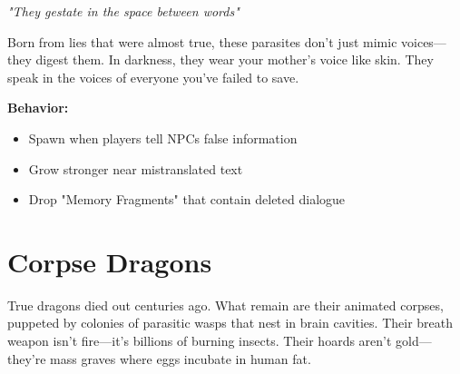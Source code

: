 \documentclass[11pt,a4paper,twoside]{book}
\begin{document}
\begin{tcolorbox}[horrorbox={Paraz'îth Vêl'thar}]
\textit{"They gestate in the space between words"}

Born from lies that were almost true, these parasites don't just mimic voices—they digest them. In darkness, they wear your mother's voice like skin. They speak in the voices of everyone you've failed to save.

\textbf{Behavior:}
\begin{itemize}
    \item Spawn when players tell NPCs false information
    \item Grow stronger near mistranslated text
    \item Drop "Memory Fragments" that contain deleted dialogue
\end{itemize}
\end{tcolorbox}

\section{Corpse Dragons}

\begin{figure}[h]
\centering
{}
\end{figure}

True dragons died out centuries ago. What remain are their animated corpses, puppeted by colonies of parasitic wasps that nest in brain cavities. Their breath weapon isn't fire—it's billions of burning insects. Their hoards aren't gold—they're mass graves where eggs incubate in human fat.
\end{document}

